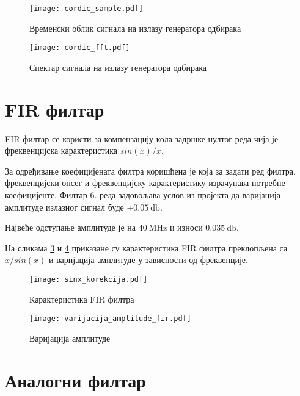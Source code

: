 \documentclass[conference]{IEEEJERM}
\begin{document}
\begin{figure}[t]
	\centering
	\texttt{[image: cordic\_sample.pdf]}
	\caption{Временски облик сигнала на излазу генератора одбирака}
	\label{fig:cordic_sample}
\end{figure}


\begin{figure}[t]
	\centering
	\texttt{[image: cordic\_fft.pdf]}
	\caption{Спектар сигнала на излазу генератора одбирака}
	\label{fig:cordic_fft}
\end{figure} 




\section{FIR филтар}
FIR филтар се користи за компензацију кола задршке нултог реда чија је фреквенцијска карактеристика $sin(x)/x$.

За одређивање коефицијената филтра коришћена је  која за задати ред филтра, 
фреквенцијски опсег и фреквенцијску карактеристику израчунава потребне коефицијенте. 
Филтар 6. реда задовољава услов из пројекта да варијација амплитуде излазног сигнал буде $\pm \SI{0.05}{\decibel}$.

Највеће одступање амплитуде је на $\SI{40}{\mega\hertz}$ и износи $\SI{0.035}{\decibel}$.

На сликама \ref{fig:fir} и \ref{fig:ampl_var} приказане су карактеристика FIR филтра преклопљена са $x/sin(x)$ и варијација амплитуде у зависности од фреквенције. 

\begin{figure}
	\centering
	\texttt{[image: sinx\_korekcija.pdf]}
	\caption{Карактеристика FIR филтра}
	\label{fig:fir}
\end{figure}

\begin{figure}
	\centering
	\texttt{[image: varijacija\_amplitude\_fir.pdf]}
	\caption{Варијација амплитуде}
	\label{fig:ampl_var}
\end{figure}


\section{Аналогни филтар}
\end{document}
